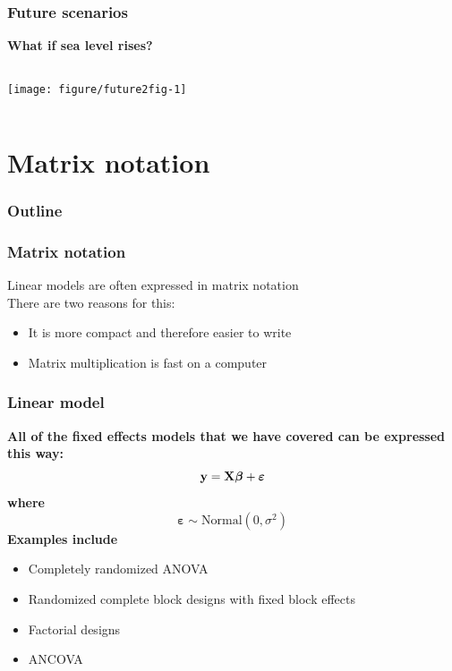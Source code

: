 \documentclass[color=usenames,dvipsnames]{beamer}\usepackage[]{graphicx}\usepackage[]{color}
\begin{document}
\begin{frame}[fragile]
  \frametitle{Future scenarios}
  {\bf What if sea level rises? \par}
  \scriptsize
  \pause


\begin{columns}
  \column{\dimexpr\paperwidth-10pt}
  \texttt{[image: figure/future2fig-1]}
\end{columns}
\end{frame}















\section{Matrix notation}


\begin{frame}
  \frametitle{Outline}
  \LARGE
\end{frame}



\begin{frame}
  \frametitle{Matrix notation}
  \large
  Linear models are often expressed in matrix notation \\
  \vfill
  There are two reasons for this: \\
  \begin{itemize}%
    \item It is more compact and therefore easier to write
    \item Matrix multiplication is fast on a computer
  \end{itemize}
\end{frame}



\begin{frame}
  \frametitle{Linear model}
  {\bf All of the fixed effects models that we have covered can be
    expressed this way:}
  \[
  {\bf y} = {\bf X}{\bm \beta} + {\bm \varepsilon}
  \]
  {\bf where}
  \[
  {\bm \varepsilon} \sim \mbox{Normal}(0, \sigma^2)
  \]
  \pause
  \vfill
  {\bf Examples include} \\
  \begin{itemize}
    \item Completely randomized ANOVA
    \item Randomized complete block designs with fixed block effects
    \item Factorial designs
    \item ANCOVA
  \end{itemize}
\end{frame}
\end{document}
